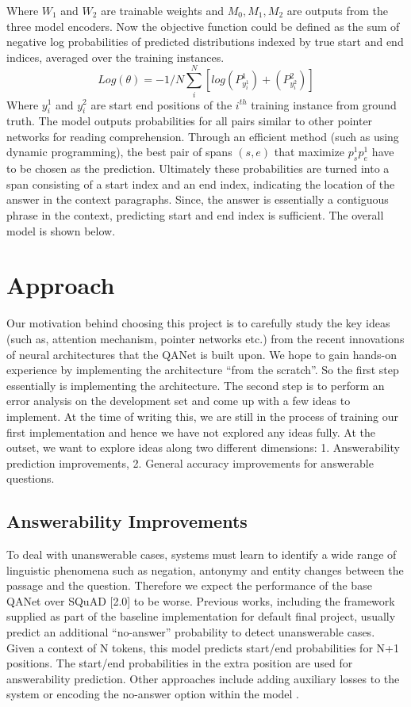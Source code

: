 \documentclass{article}
\begin{document}
Where $W_1$ and $W_2$ are trainable weights and $M_0 , M_1 , M_2$ are outputs from the three model encoders. Now the objective function could be defined as the sum of negative log probabilities of predicted distributions indexed by true start and end indices, averaged over the training instances. $$Log(\theta) = - 1/N \sum_i^N [log(P^1_{{y^1_i}}) + (P^2_{{y^2_i}})]$$
Where $y_i^1$ and $y_i^2$ are start end positions of the $i^{{th}}$  training instance from ground truth. The model outputs probabilities for all pairs similar to other pointer networks for reading comprehension. Through an efficient method (such as using dynamic programming), the best pair of spans $(s,e)$ that maximize $p_s^1 p_e^1$ have to be chosen as the prediction. Ultimately these probabilities are turned into a span consisting of a start index and an end index, indicating the location of the answer in the context paragraphs. Since, the answer is essentially a contiguous phrase in the context, predicting start and end index is sufficient. The overall model is shown below.

\section{Approach}
Our motivation behind choosing this project is to carefully study the key ideas (such as, attention mechanism, pointer networks etc.) from the recent innovations of neural architectures that the QANet is built upon. We hope to gain hands-on experience by implementing the architecture “from the scratch”. So the first step essentially is implementing the architecture. The second step is to perform an error analysis on the development set and come up with a few ideas to implement. At the time of writing this, we are still in the process of training our first implementation and hence we have not explored any ideas fully. At the outset, we want to explore ideas along two different dimensions: 1. Answerability prediction improvements, 2. General accuracy improvements for answerable questions. 

\subsection{Answerability Improvements} To deal with unanswerable cases, systems must learn to identify a wide range of linguistic phenomena such as negation, antonymy and entity changes between the passage and the question. Therefore we expect the performance of the base QANet over SQuAD [2.0] to be worse. Previous works, including the framework supplied as part of the baseline implementation for default final project, usually predict an additional “no-answer” probability to detect unanswerable cases. Given a context of N tokens, this model predicts start/end probabilities for N+1 positions. The start/end probabilities in the extra position are used for answerability prediction. Other approaches include adding auxiliary losses to the system \cite{hu2018read+} or encoding the no-answer option within the model \cite{clark2017simple}.
\end{document}
